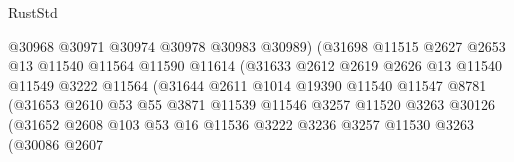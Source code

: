 \begin{lexlean}{RustStd}
\begin{coremodule}
                                      @30968
                                      @30971
                                      @30974
                                      @30978
                                      @30983
                                      @30989)
                                    (@31698
                                      @11515
                                      @2627
                                      @2653
                                      @13
                                      @11540
                                      @11564
                                      @11590
                                      @11614
                                      (@31633
                                        @2612
                                        @2619
                                        @2626
                                        @13
                                        @11540
                                        @11549
                                        @3222
                                        @11564
                                        (@31644
                                          @2611
                                          @1014
                                          @19390
                                          @11540
                                          @11547
                                          @8781
                                          (@31653
                                            @2610
                                            @53
                                            @55
                                            @3871
                                            @11539
                                            @11546
                                            @3257
                                            @11520
                                            @3263
                                            @30126
                                            (@31652
                                              @2608
                                              @103
                                              @53
                                              @16
                                              @11536
                                              @3222
                                              @3236
                                              @3257
                                              @11530
                                              @3263
                                              (@30086
                                                @2607

\end{coremodule}
\end{lexlean}
